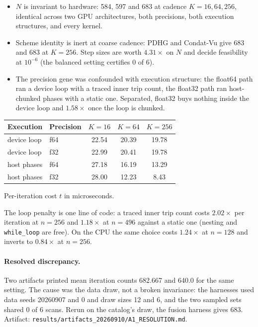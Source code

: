 \begin{itemize}
\item $N$ is invariant to hardware: 584, 597 and 683 at cadence $K=16, 64,
  256$, identical across two GPU architectures, both precisions, both
  execution structures, and every kernel.
\item Scheme identity is inert at coarse cadence: PDHG and Condat-Vu give 683
  and 683 at $K=256$. Step sizes are worth $4.31\times$ on $N$ and decide
  feasibility at $10^{-6}$ (the balanced setting certifies 0 of 6).
\item The precision gene was confounded with execution structure: the
  float64 path ran a device loop with a traced inner trip count, the float32
  path ran host-chunked phases with a static one. Separated, float32 buys
  nothing inside the device loop and $1.58\times$ once the loop is chunked.
\end{itemize}

\begin{center}
\small
\begin{tabular}{llccc}
\toprule
Execution & Precision & $K=16$ & $K=64$ & $K=256$ \\
\midrule
device loop & f64 & 22.54 & 20.39 & 19.78 \\
device loop & f32 & 22.99 & 20.41 & 19.78 \\
host phases & f64 & 27.18 & 16.19 & 13.29 \\
host phases & f32 & 28.00 & 12.23 & 8.43 \\
\bottomrule
\end{tabular}

Per-iteration cost $t$ in microseconds.
\end{center}

The loop penalty is one line of code: a traced inner trip count costs
$2.02\times$ per iteration at $n=256$ and $1.18\times$ at $n=496$ against a
static one (nesting and \texttt{while\_loop} are free). On the CPU the same
choice costs $1.24\times$ at $n=128$ and inverts to $0.84\times$ at $n=256$.

\paragraph{Resolved discrepancy.}
\label{app:log:a1}
Two artifacts printed mean iteration counts 682.667 and 640.0 for the same
setting. The cause was the data draw, not a broken invariance: the harnesses
used data seeds 20260907 and 0 and draw sizes 12 and 6, and the two sampled
sets shared 0 of 6 scans. Rerun on the catalog's draw, the fusion harness
gives 683. Artifact: \texttt{results/artifacts\_20260910/A1\_RESOLUTION.md}.

